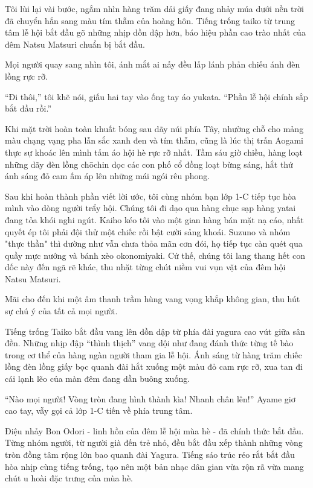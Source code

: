 \documentclass[../main.tex]{subfiles}
\begin{document}
Tôi lùi lại vài bước, ngắm nhìn hàng trăm dải giấy đang nhảy múa dưới nền trời đã chuyển hẳn sang màu tím thẫm của hoàng hôn. Tiếng trống taiko từ trung tâm lễ hội bắt đầu gõ những nhịp dồn dập hơn, báo hiệu phần cao trào nhất của đêm Natsu Matsuri chuẩn bị bắt đầu.

Mọi người quay sang nhìn tôi, ánh mắt ai nấy đều lấp lánh phản chiếu ánh đèn lồng rực rỡ.

``Đi thôi,'' tôi khẽ nói, giấu hai tay vào ống tay áo yukata. ``Phần lễ hội chính sắp bắt đầu rồi.''

\ct

Khi mặt trời hoàn toàn khuất bóng sau dãy núi phía Tây, nhường chỗ cho mảng màu chạng vạng pha lẫn sắc xanh đen và tím thẫm, cũng là lúc thị trấn Aogami thực sự khoác lên mình tấm áo hội hè rực rỡ nhất. Tầm sáu giờ chiều, hàng loạt những dãy đèn lồng chōchin dọc các con phố cổ đồng loạt bừng sáng, hắt thứ ánh sáng đỏ cam ấm áp lên những mái ngói rêu phong.

Sau khi hoàn thành phần viết lời ước, tôi cùng nhóm bạn lớp 1-C tiếp tục hòa mình vào dòng người trẩy hội. Chúng tôi đi dạo qua hàng chục sạp hàng yatai đang tỏa khói nghi ngút. Kaiho kéo tôi vào một gian hàng bán mặt nạ cáo, nhất quyết ép tôi phải đội thử một chiếc rồi bật cười sảng khoái. Suzuno và nhóm "thực thần" thì dường như vẫn chưa thỏa mãn cơn đói, họ tiếp tục càn quét qua quầy mực nướng và bánh xèo okonomiyaki. Cứ thế, chúng tôi lang thang hết con dốc này đến ngã rẽ khác, thu nhặt từng chút niềm vui vụn vặt của đêm hội Natsu Matsuri.

Mãi cho đến khi một âm thanh trầm hùng vang vọng khắp không gian, thu hút sự chú ý của tất cả mọi người.

Tiếng trống Taiko bắt đầu vang lên dồn dập từ phía đài yagura cao vút giữa sân đền. Những nhịp đập ``thình thịch'' vang dội như đang đánh thức từng tế bào trong cơ thể của hàng ngàn người tham gia lễ hội. Ánh sáng từ hàng trăm chiếc lồng đèn lồng giấy bọc quanh đài hắt xuống một màu đỏ cam rực rỡ, xua tan đi cái lạnh lẽo của màn đêm đang dần buông xuống.

``Nào mọi người! Vòng tròn đang hình thành kìa! Nhanh chân lên!'' Ayame giơ cao tay, vẫy gọi cả lớp 1-C tiến về phía trung tâm.

Điệu nhảy Bon Odori - linh hồn của đêm lễ hội mùa hè - đã chính thức bắt đầu. Từng nhóm người, từ người già đến trẻ nhỏ, đều bắt đầu xếp thành những vòng tròn đồng tâm rộng lớn bao quanh đài Yagura. Tiếng sáo trúc réo rắt bắt đầu hòa nhịp cùng tiếng trống, tạo nên một bản nhạc dân gian vừa rộn rã vừa mang chút u hoài đặc trưng của mùa hè.
\end{document}
